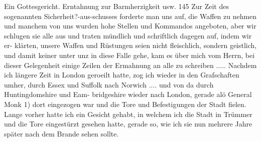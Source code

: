 Ein Gottesgericht. Erntahnung zur Barmherzigkeit usw. 145
Zur Zeit des sogenannten Sicherheit?-aus-schusses forderte man uns
auf, die Waffen zu nehmen und manchem von uns wurden hohe
Stellen und Kommandos angeboten, aber wir schlugen sie alle aus
und traten mündlich und schriftlich dagegen auf, indem wir er-
klärten, unsere Waffen und Rüstungen seien nicht fleischlich, sondern
geistlich, und damit keiner unter unz in diese Falle gehe, kam es
über mich vom Herrn, bei dieser Gelegenheit einige Zeilen der
Ermahnung an alle zu schreiben .....
Nachdem ich längere Zeit in London geroeilt hatte, zog ich
wieder in den Grafschaften umher, durch Essex und Suffolk nach
Norwich .... und von da durch Huntingdomshire und Eam-
bridgeshire wieder nach London, gerade alö General Monk 1) dort
eingezogen war und die Tore und Befestigungen der Stadt
fielen. Lange vorher hatte ich ein Gesicht gehabt, in welchem
ich die Stadt in Trümmer und die Tore eingestürzt gesehen
hatte, gerade so, wie ich sie nun mehrere Jahre später nach dem
Brande sehen sollte.